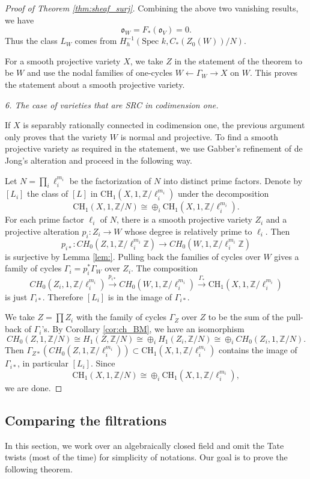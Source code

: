 \documentclass{amsart}
\theoremstyle{definition}
\theoremstyle{remark}
\newcommand{\mbb}{\mathbb}
\newcommand{\ZZ}{\mbb{Z}}
\newcommand{\SP}{\text{Spec }}
\begin{document}
\begin{proof}[Proof of Theorem \ref{thm:sheaf_surj}]
Combining the above two vanishing results, we have $$\mathfrak{o}_W=F_*(\mathfrak{o}_V)=0.$$
Thus the class $L_W$ comes from $H^{-1}_h(\SP k, C_*(Z_0(W))/N).$

For a smooth projective variety $X$, we take $Z$ in the statement of the theorem to be $W$ and use the nodal families of one-cycles $W \leftarrow \Gamma_W \to X$ on $W$. 
This proves the statement about a smooth projective variety.

\textit{6. The case of varieties that are SRC in codimension one.}

If $X$ is separably rationally connected in codimension one, the previous argument only proves that the variety $W$ is normal and projective. 
To find a smooth projective variety as required in the statement, we use Gabber's refinement of de Jong's alteration and proceed in the following way.

Let $N=\prod_i \ell_i^{m_i}$ be the factorization of $N$ into distinct prime factors. 
Denote by $[L_i]$ the class of $[L]$ in $\text{CH}_1(X, 1, \ZZ/\ell_i^{m_i})$ under the decomposition
$$\text{CH}_1(X, 1, \ZZ/N)\cong \oplus_i \text{CH}_1(X, 1, \ZZ/\ell_i^{m_i}).$$
For each prime factor $\ell_i$ of $N$, there is a smooth projective variety $Z_i$ and a projective alteration $p_i:Z_i \to W$ whose degree is relatively prime to $\ell_i$. Then 
\[
p_{i*}: CH_0(Z, 1, \ZZ/\ell_i^{m_i}\ZZ)  \to CH_0(W, 1, \ZZ/\ell_i^{m_i}\ZZ) 
\]
is surjective by Lemma \ref{lem:}.
Pulling back the families of cycles over $W$ gives a family of cycles $\Gamma_i=p_i^*\Gamma_W$ over $Z_i$. 
The composition
\[
CH_0(Z_i, 1, \ZZ/\ell_i^{m_i})  \xrightarrow{p_{i*}} CH_0(W, 1, \ZZ/\ell_i^{m_i}) \xrightarrow{\Gamma_*} \text{CH}_1(X, 1, \ZZ/\ell_i^{m_i})
\]
is just $\Gamma_{i*}$.
Therefore $[L_i]$ is in the image of $\Gamma_{i*}$.

We take $Z=\prod Z_i$ with the family of cycles $\Gamma_Z$ over $Z$ to be the sum of the pull-back of $\Gamma_i$'s.
By Corollary \ref{cor:ch_BM}, we have an isomorphism
\[
CH_0(Z, 1, \ZZ/N)\cong H_1(Z, \ZZ/N)\cong \oplus_i H_1(Z_i, \ZZ/N) \cong \oplus_i CH_0(Z_i, 1, \ZZ/N).
\]
Then $\Gamma_{Z*}(CH_0(Z, 1, \ZZ/\ell_i^{m_i}))\subset \text{CH}_1(X, 1, \ZZ/\ell_i^{m_i})$ contains the image of $\Gamma_{i*}$, in particular $[L_i]$.
Since $$\text{CH}_1(X, 1, \ZZ/N)\cong \oplus_i \text{CH}_1(X, 1, \ZZ/\ell_i^{m_i}), $$ we are done.
\end{proof}




\subsection{Comparing the filtrations}
In this section, we work over an algebraically closed field and omit the Tate twists (most of the time) for simplicity of notations.
Our goal is to prove the following theorem.
\end{document}
